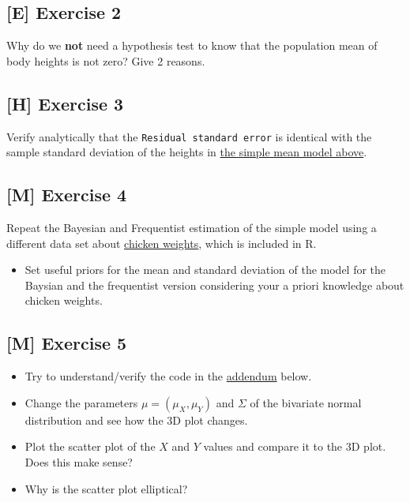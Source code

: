 \documentclass[
]{book}
\providecommand{\tightlist}{%
  \setlength{\itemsep}{0pt}\setlength{\parskip}{0pt}}
\begin{document}
\subsection{{[}E{]} Exercise 2}\label{exercise2_Intro}

Why do we \textbf{not} need a hypothesis test to know that the population mean of body heights is not zero?
Give 2 reasons.

\subsection{{[}H{]} Exercise 3}\label{exercise3_Intro}

Verify analytically that the \texttt{Residual\ standard\ error} is identical with
the sample standard deviation of the heights in \hyperref[classical_simple_mean_model]{the simple mean model above}.

\subsection{{[}M{]} Exercise 4}\label{exercise4_Intro}

Repeat the Bayesian and Frequentist estimation of the simple model using a different data set about
\href{https://stat.ethz.ch/R-manual/R-devel/library/datasets/html/ChickWeight.html}{chicken weights},
which is included in R.

\begin{itemize}
\tightlist
\item
  Set useful priors for the mean and standard deviation of the model
  for the Baysian and the frequentist version considering
  your a priori knowledge about chicken weights.
\end{itemize}

\subsection{{[}M{]} Exercise 5}\label{exercise5_Intro}

\begin{itemize}
\tightlist
\item
  Try to understand/verify the code in the \hyperref[addendum]{addendum} below.
\item
  Change the parameters \(\mu = (\mu_X, \mu_Y)\) and \(\Sigma\) of the bivariate normal distribution
  and see how the 3D plot changes.
\item
  Plot the scatter plot of the \(X\) and \(Y\) values and compare it to the 3D plot.
  Does this make sense?
\item
  Why is the scatter plot elliptical?
\end{itemize}
\end{document}
